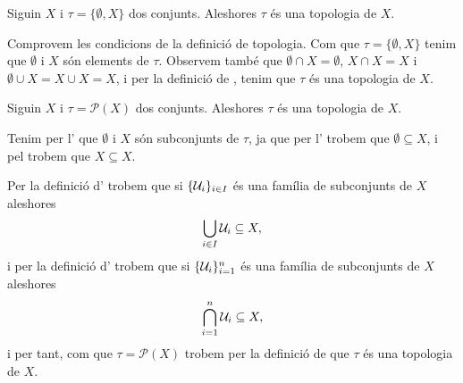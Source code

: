 \documentclass[../Apunts.tex]{subfiles}
\begin{document}
	\begin{example}
		\label{ex:topologia grollera}
		Siguin \(X\) i \(\tau=\{\emptyset,X\}\) dos conjunts. Aleshores \(\tau\) és una topologia de \(X\).
		\begin{solution}
			Comprovem les condicions de la definició de topologia. Com que \(\tau=\{\emptyset,X\}\) tenim que \(\emptyset\) i \(X\) són elements de \(\tau\). Observem també que \(\emptyset\cap X=\emptyset\), \(X\cap X=X\) i \(\emptyset\cup X=X\cup X=X\), i per la definició de , tenim que \(\tau\) és una topologia de \(X\).
		\end{solution}
	\end{example}
	\begin{example}
		\label{ex:topologia discreta}
		Siguin \(X\) i \(\tau=\mathcal{P}(X)\) dos conjunts. Aleshores \(\tau\) és una topologia de \(X\).
		\begin{solution}
			Tenim per l' que \(\emptyset\) i \(X\) són subconjunts de \(\tau\), ja que per l' trobem que \(\emptyset\subseteq X\), i pel  trobem que \(X\subseteq X\).
			
			Per la definició d' trobem que si \(\{\mathcal{U}_{i}\}_{i\in I}\) és una família de subconjunts de \(X\) aleshores
			\[\bigcup_{i\in I}\mathcal{U}_{i}\subseteq X,\]
			i per la definició d' trobem que si \(\{\mathcal{U}_{i}\}_{i=1}^{n}\) és una família de subconjunts de \(X\) aleshores
			\[\bigcap_{i=1}^{n}\mathcal{U}_{i}\subseteq X,\]
			i per tant, com que \(\tau=\mathcal{P}(X)\) trobem per la definició de  que \(\tau\) és una topologia de \(X\).
		\end{solution}
	\end{example}
\end{document}
